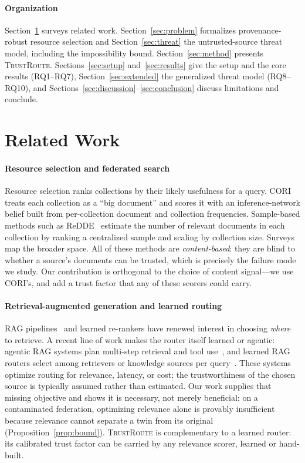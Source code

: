\documentclass[preprint,12pt]{elsarticle}
\newcommand{\system}{\textsc{TrustRoute}}
\begin{document}
\paragraph*{Organization}
Section~\ref{sec:related} surveys related work. Section~\ref{sec:problem}
formalizes provenance-robust resource selection and Section~\ref{sec:threat} the
untrusted-source threat model, including the impossibility bound.
Section~\ref{sec:method} presents \system. Sections~\ref{sec:setup}
and~\ref{sec:results} give the setup and the core results (RQ1--RQ7),
Section~\ref{sec:extended} the generalized threat model (RQ8--RQ10), and
Sections~\ref{sec:discussion}--\ref{sec:conclusion} discuss limitations and
conclude.

\section{Related Work}\label{sec:related}

\paragraph*{Resource selection and federated search}
Resource selection ranks collections by their likely usefulness for a query.
CORI~\cite{callan1995cori} treats each collection as a ``big document'' and scores
it with an inference-network belief built from per-collection document and
collection frequencies. Sample-based methods such as ReDDE~\cite{si2003redde}
estimate the number of relevant documents in each collection by ranking a
centralized sample and scaling by collection size. Surveys
\cite{callan2000distributed,shokouhi2011federated} map the broader space. All of
these methods are \emph{content-based}: they are blind to whether a source's
documents can be trusted, which is precisely the failure mode we study. Our
contribution is orthogonal to the choice of content signal---we use CORI's, and
add a trust factor that any of these scorers could carry.

\paragraph*{Retrieval-augmented generation and learned routing}
RAG pipelines~\cite{lewis2020rag,gao2023rag} and learned re-rankers
\cite{nogueira2019passage} have renewed interest in choosing \emph{where} to
retrieve. A recent line of work makes the router itself learned or agentic:
agentic RAG systems plan multi-step retrieval and tool use~\cite{singh2025agentic},
and learned RAG routers select among retrievers or knowledge sources per
query~\cite{zhang2025ragrouter}. These systems optimize routing for relevance,
latency, or cost; the trustworthiness of the chosen source is typically assumed
rather than estimated. Our work supplies that missing objective and shows it is
necessary, not merely beneficial: on a contaminated federation, optimizing
relevance alone is provably insufficient because relevance cannot separate a twin
from its original (Proposition~\ref{prop:bound}). \system{} is complementary to a
learned router: its calibrated trust factor can be carried by any relevance
scorer, learned or hand-built.
\end{document}
